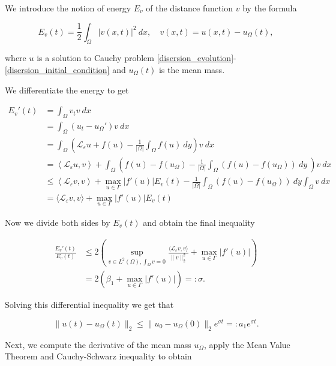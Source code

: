\documentclass[12pt, a4paper]{article}
\theoremstyle{break}
\theoremstyle{break}
\theoremstyle{break}
\theoremstyle{break}
\theoremstyle{break}
\newcommand{\Leo}{\mathcal{L}_{\varepsilon}}
\begin{document}
We introduce the notion of energy $E_v$ of the distance function $v$ by the formula

\begin{equation*}
    E_v(t) = \frac{1}{2}\int_\Omega |v(x,t)|^2 \:dx, \quad v(x,t) = u(x,t) - u_\Omega(t),
\end{equation*}

where $u$ is a solution to Cauchy problem \eqref{disersion_evolution}-\eqref{disersion_initial_condition} and $u_\Omega(t)$ is the mean mass.

We differentiate the energy to get

\begin{align*}
    E_v'(t) &= \int_\Omega v_tv \:dx \\
    &= \int_\Omega \left(u_t - u_\Omega'\right)v\:dx \\
    &= \int_\Omega \left(\Leo u + f(u) - \frac{1}{|\Omega|} \int_\Omega f(u)\:dy\right)v\:dx \\
    &= \left\langle \Leo u, v\right\rangle + \int_\Omega \left( f(u) - f(u_\Omega) - \frac{1}{|\Omega|} \int_\Omega \left(f(u) - f(u_\Omega)\right)\:dy\:\right) v \: dx \\
    &\leq \left\langle \Leo v, v\right\rangle + \max_{u \in \Gamma}|f'(u)| E_v(t) - \frac{1}{|\Omega|} \int_\Omega \left(f(u) - f(u_\Omega)\right)\:dy \int_\Omega v\:dx\\
    &= \langle \Leo v, v\rangle + \max_{u \in \Gamma}|f'(u)| E_v(t)
\end{align*}

Now we divide both sides by $E_v(t)$ and obtain the final inequality

\begin{align*}
    \frac{E_v'(t)}{E_v(t)} &\leq 2\left(\sup_{v \in L^2(\Omega), \int_\Omega v = 0}\frac{\langle \Leo v, v \rangle}{\|v\|_2^2} + \max_{u \in \Gamma}|f'(u)|\right) \\
    &= 2\left(\beta_1 + \max_{u \in \Gamma}|f'(u)|\right) =: \sigma.
\end{align*}

Solving this differential inequality we get that

\begin{equation*}
    \|u(t) - u_\Omega(t)\|_2 \leq \|u_0 - u_{\Omega}(0)\|_2 e^{\sigma t} =: a_1 e^{\sigma t}.
\end{equation*}

Next, we compute the derivative of the mean mass $u_\Omega$, apply the Mean Value Theorem and Cauchy-Schwarz inequality to obtain
\end{document}
